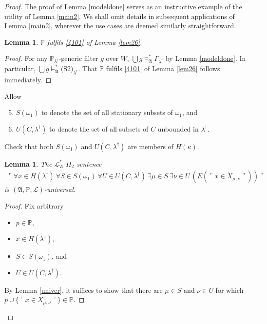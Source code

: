 \documentclass[12pt, twoside]{memoir}
\numberwithin{equation}{section}
\newtheorem{lem}[thm]{Lemma}
\theoremstyle{definition}
\theoremstyle{remark}
\theoremstyle{definition}
\theoremstyle{definition}
\theoremstyle{definition}
\theoremstyle{remark}
\begin{document}
\begin{proof}
The proof of Lemma \ref{modeldone} serves as an instructive example of the utility of Lemma \ref{main2}. We shall omit details in subsequent applications of Lemma \ref{main2}, wherever the use cases are deemed similarly straightforward. 

\begin{lem}\label{1done}
$\mathbb{P}$ fulfils \ref{4101} of Lemma \ref{lem26}.
\end{lem}

\begin{proof}
For any $\mathbb{P}_{\lambda'}$-generic filter $g$ over $W$, $\bigcup g \models^*_{\mathfrak{A}} \Gamma_{\lambda^{\dagger}}$ by Lemma \ref{modeldone}. In particular, $\bigcup g \models^*_{\mathfrak{A}} \text{(S2)}_{\lambda^{\dagger}}$. That $\mathbb{P}$ fulfils \ref{4101} of Lemma \ref{lem26} follows immediately.
\end{proof}

Allow
\begin{enumerate}[label=(\Alph*)]
    \setcounter{enumi}{4}
    \item $S(\omega_1)$ to denote the set of all stationary subsets of $\omega_1$, and
    \item\label{def423} $U(C, \lambda^{\dagger})$ to denote the set of all subsets of $C$ unbounded in $\lambda^{\dagger}$.
\end{enumerate}
Check that both $S(\omega_1)$ and $U(C, \lambda^{\dagger})$ are members of $H(\kappa)$.

\begin{lem}\label{sideuni}
The $\mathcal{L}^*_{\mathfrak{A}}$-$\Pi_2$ sentence 
\begin{align}\label{c9}
    \ulcorner \forall x \in H(\lambda^{\dagger}) \ \forall S \in S(\omega_1) \ \forall U \in U(C, \lambda^{\dagger}) \ \exists \mu \in S \ \exists \nu \in U \ (E(\ulcorner x \in \dot{X}_{\mu, \nu} \urcorner)) \urcorner
\end{align} 
is $(\mathfrak{A}, \mathbb{P}, \mathcal{L})$-universal.
\end{lem}

\begin{proof}
Fix arbitrary
\begin{itemize}
    \item $p \in \mathbb{P}$,
    \item $x \in H(\lambda^{\dagger})$,
    \item $S \in S(\omega_1)$, and
    \item $U \in U(C, \lambda^{\dagger})$.
\end{itemize}
By Lemma \ref{univer}, it suffices to show that there are $\mu \in S$ and $\nu \in U$ for which $p \cup \{\ulcorner x \in \dot{X}_{\mu, \nu} \urcorner\} \in \mathbb{P}$.


\end{proof}
\end{proof}
\end{document}
